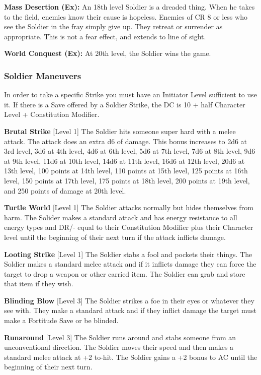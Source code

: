 \textbf{Mass Desertion (Ex):} An 18th level Soldier is a dreaded thing. When he takes to the field, enemies know their cause is hopeless. Enemies of CR 8 or less who see the Soldier in the fray simply give up. They retreat or surrender as appropriate. This is not a fear effect, and extends to line of sight.

\textbf{World Conquest (Ex):} At 20th level, the Soldier wins the game.

\subsubsection{Soldier Maneuvers}

In order to take a specific Strike you must have an Initiator Level sufficient to use it. If there is a Save offered by a Soldier Strike, the DC is 10 + half Character Level + Constitution Modifier.

\newcommand{\soldiermaneuver}[3]{\textbf{#1} [Level #2] #3\medskip{}}

\soldiermaneuver{Brutal Strike}{1}{The Soldier hits someone super hard with a melee attack. The attack does an extra d6 of damage. This bonus increases to 2d6 at 3rd level, 3d6 at 4th level, 4d6 at 6th level, 5d6 at 7th level, 7d6 at 8th level, 9d6 at 9th level, 11d6 at 10th level, 14d6 at 11th level, 16d6 at 12th level, 20d6 at 13th level, 100 points at 14th level, 110 points at 15th level, 125 points at 16th level, 150 points at 17th level, 175 points at 18th level, 200 points at 19th level, and 250 points of damage at 20th level.}

\soldiermaneuver{Turtle World}{1}{The Soldier attacks normally but hides themselves from harm. The Solider makes a standard attack and has energy resistance to all energy types and DR/- equal to their Constitution Modifier plus their Character level until the beginning of their next turn if the attack inflicts damage.}

\soldiermaneuver{Looting Strike}{1}{The Soldier stabs a fool and pockets their things. The Soldier makes a standard melee attack and if it inflicts damage they can force the target to drop a weapon or other carried item. The Soldier can grab and store that item if they wish.}

\soldiermaneuver{Blinding Blow}{3}{The Soldier strikes a foe in their eyes or whatever they see with. They make a standard attack and if they inflict damage the target must make a Fortitude Save or be blinded.}

\soldiermaneuver{Runaround}{3}{The Soldier runs around and stabs someone from an unconventional direction. The Soldier moves their speed and then makes a standard melee attack at +2 to-hit. The Soldier gains a +2 bonus to AC until the beginning of their next turn.}

